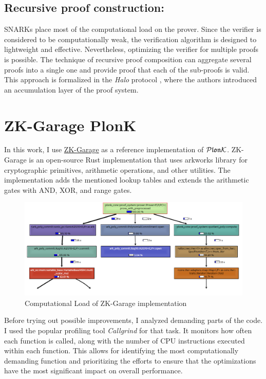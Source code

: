 \subsection{Recursive proof construction:} SNARKs place most of the computational load on the prover. Since the verifier is considered to be computationally weak, the verification algorithm is designed to lightweight and effective. Nevertheless, optimizing the verifier for multiple proofs is possible. The technique of recursive proof composition can aggregate several proofs into a single one and provide proof that each of the sub-proofs is valid. This approach is formalized in the  \textit{Halo} protocol \cite{halo}, where the authors introduced an accumulation layer of the proof system.

\section{ZK-Garage PlonK}
In this work, I  use \href{https://github.com/ZK-Garage/plonk}{ZK-Garage} as a reference implementation of $\mathcal{P}\mathfrak{lon}\mathcal{K}$. ZK-Garage is an open-source Rust implementation that uses arkworks library \cite{arkworks} for cryptographic primitives, arithmetic operations, and other utilities. The implementation adds the mentioned lookup tables and extends the arithmetic gates with AND, XOR, and range gates.

\begin{figure}
    \centering
    \includegraphics[width=1\linewidth]{figures//optimizations/computation_load.png}
    \caption{Computational Load of ZK-Garage implementation}
    \label{fig:profiler}
\end{figure}

Before trying out possible improvements, I analyzed demanding parts of the code. I used the popular profiling tool \textit{Callgrind} for that task. It monitors how often each function is called, along with the number of CPU instructions executed within each function. This allows for identifying the most computationally demanding function and prioritizing the efforts to ensure that the optimizations have the most significant impact on overall performance. 


